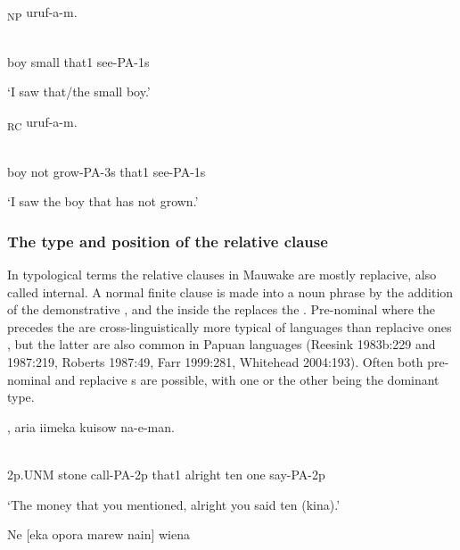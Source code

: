 \ea%
\label{ex:x1527}
\textsubscript{NP}  uruf-a-m. \\
      \\
\glt
\z

boy  small  that1  see-PA-1s

`I saw that/the small boy.'

\ea%
\label{ex:x1528}
\textsubscript{RC}  uruf-a-m. \\
      \\
\glt
\z

boy  not  grow-PA-3s  that1  see-PA-1s

`I saw the boy that has not grown.'

\subsubsection[The type and position of the relative clause]{The type and position of the relative clause}
\hypertarget{RefHeading23321935131865}{}
In typological terms the relative clauses in Mauwake are mostly replacive, also called internal. A normal finite clause is made into a noun phrase by the addition of the demonstrative , and the  inside the  replaces the . Pre-nominal  where the precedes the  are cross-linguistically more typical of  languages than replacive ones \citep[144]{Keenan1985}, but the latter are also common in Papuan languages (Reesink 1983b:229 and 1987:219, Roberts 1987:49, Farr 1999:281, Whitehead 2004:193). Often both pre-nominal and replacive s are possible, with one or the other being the dominant type.

\ea%
\label{ex:x1529}
,  aria  iimeka  kuisow  na-e-man. \\
      \\
\glt
\z

2p.UNM  stone  call-PA-2p  that1  alright  ten  one  say-PA-2p

`The money that you mentioned, alright you said ten (kina).'

\ea%
\label{ex:x1530}
\gll Ne  [eka  opora    marew  nain]  wiena  \\
      \\
\glt
\z

